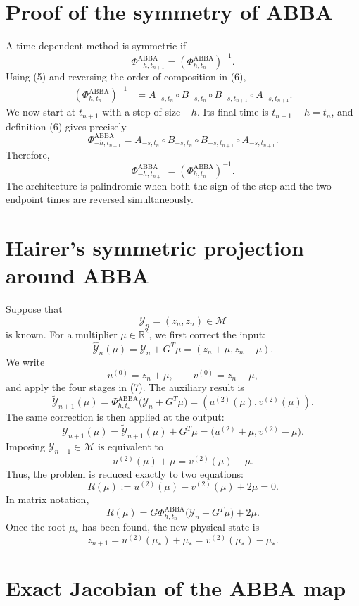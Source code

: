 \documentclass[11pt,a4paper]{article}
\newcommand{\R}{\mathbb{R}}
\newcommand{\Y}{\mathcal{Y}}
\newcommand{\M}{\mathcal{M}}
\newcommand{\PhiAB}{\Phi^{\mathrm{ABBA}}_{h,t_n}}
\begin{document}
\section{Proof of the symmetry of ABBA}

A time-dependent method is symmetric if
\[
 \Phi^{\mathrm{ABBA}}_{-h,t_{n+1}}
 =\left(\Phi^{\mathrm{ABBA}}_{h,t_n}\right)^{-1}. \tag{9}
\]
Using (5) and reversing the order of composition in (6),
\begin{align*}
 \left(\Phi^{\mathrm{ABBA}}_{h,t_n}\right)^{-1}
 &={}
 A_{-s,t_n}
 \circ B_{-s,t_n}
 \circ B_{-s,t_{n+1}}
 \circ A_{-s,t_{n+1}}.
\end{align*}
We now start at $t_{n+1}$ with a step of size $-h$. Its final time is
$t_{n+1}-h=t_n$, and definition (6) gives precisely
\[
 \Phi^{\mathrm{ABBA}}_{-h,t_{n+1}}
 =A_{-s,t_n}
  \circ B_{-s,t_n}
  \circ B_{-s,t_{n+1}}
  \circ A_{-s,t_{n+1}}.
\]
Therefore,
\[
 \boxed{
 \Phi^{\mathrm{ABBA}}_{-h,t_{n+1}}
 =\left(\Phi^{\mathrm{ABBA}}_{h,t_n}\right)^{-1}.
 }
\]
The architecture is palindromic when both the sign of the step and the two endpoint times
are reversed simultaneously.

\section{Hairer's symmetric projection around ABBA}

Suppose that
\[
 \Y_n=(z_n,z_n)\in\M
\]
is known. For a multiplier $\mu\in\R^2$, we first correct the input:
\[
 \widehat{\Y}_n(\mu)
 =\Y_n+G^T\mu
 =(z_n+\mu,z_n-\mu).
\]
We write
\[
 u^{(0)}=z_n+\mu,
 \qquad
 v^{(0)}=z_n-\mu,
\]
and apply the four stages in (7). The auxiliary result is
\[
 \widetilde{\Y}_{n+1}(\mu)
 =\PhiAB\bigl(\Y_n+G^T\mu\bigr)
 =(u^{(2)}(\mu),v^{(2)}(\mu)).
\]
The same correction is then applied at the output:
\[
 \Y_{n+1}(\mu)
 =\widetilde{\Y}_{n+1}(\mu)+G^T\mu
 =\bigl(u^{(2)}+\mu,v^{(2)}-\mu\bigr). \tag{10}
\]
Imposing $\Y_{n+1}\in\M$ is equivalent to
\[
 u^{(2)}(\mu)+\mu=v^{(2)}(\mu)-\mu.
\]
Thus, the problem is reduced exactly to two equations:
\[
 \boxed{
 R(\mu)
 :=u^{(2)}(\mu)-v^{(2)}(\mu)+2\mu=0.
 } \tag{11}
\]
In matrix notation,
\[
 R(\mu)
 =G\PhiAB\bigl(\Y_n+G^T\mu\bigr)+2\mu. \tag{12}
\]
Once the root $\mu_*$ has been found, the new physical state is
\[
 \boxed{
 z_{n+1}=u^{(2)}(\mu_*)+\mu_*
          =v^{(2)}(\mu_*)-\mu_*.
 } \tag{13}
\]

\section{Exact Jacobian of the ABBA map}
\end{document}
